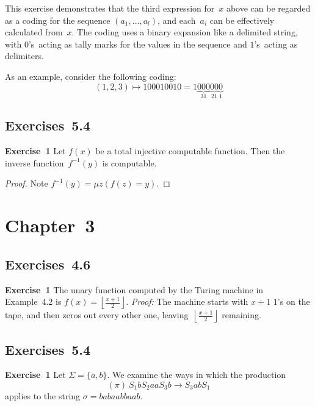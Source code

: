 \documentclass[letterpaper]{article}
\newcommand{\exercise}[2][]{\noindent\textbf{Exercise~{#2}}\ifthenelse{\isempty{#1}}{\textbf{.}}{ ({#1})\textbf{.}}}
\newcommand{\floor}[1]{\left\lfloor{#1}\right\rfloor}
\theoremstyle{plain}
\theoremstyle{definition}
\theoremstyle{remark}
\begin{document}
\noindent This exercise demonstrates that the third expression for~$x$ above can be regarded as a coding for the sequence $(a_1,\ldots,a_l)$, and each~$a_i$ can be effectively calculated from~$x$. The coding uses a binary expansion like a delimited string, with $0$'s~acting as tally marks for the values in the sequence and $1$'s~acting as delimiters.

As an example, consider the following coding:
$$(1,2,3)\mapsto 100010010=1\underbrace{000}_31\underbrace{00}_21\underbrace{0}_1$$

\subsection*{Exercises~5.4}
\exercise{1}
Let $f(x)$ be a total injective computable function. Then the inverse function~$f^{-1}(y)$ is computable.
\begin{proof}
Note $f^{-1}(y)=\mu z(f(z)=y)$.
\end{proof}

\section*{Chapter~3}
\subsection*{Exercises~4.6}
\exercise{1}
The unary function computed by the Turing machine in Example~4.2 is $f(x)=\floor{\tfrac{x+1}{2}}$. \emph{Proof:} The machine starts with $x+1$ $1$'s on the tape, and then zeros out every other one, leaving~$\floor{\tfrac{x+1}{2}}$ remaining.

\subsection*{Exercises~5.4}
\exercise{1}
Let $\Sigma=\{a,b\}$. We examine the ways in which the production
$$(\pi)\ S_1bS_2aaS_3b\to S_3abS_1$$
applies to the string $\sigma=babaabbaab$.
\end{document}
